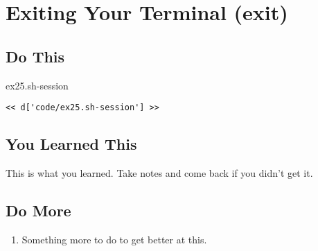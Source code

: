 \chapter{Exiting Your Terminal (exit)}

\section{Do This}

\begin{code}{ex25.sh-session}
\begin{Verbatim}
<< d['code/ex25.sh-session'] >>
\end{Verbatim}
\end{code}


\section{You Learned This}

This is what you learned.  Take notes and come back if you didn't get it.

\section{Do More}

\begin{enumerate}
\item Something more to do to get better at this.
\end{enumerate}


